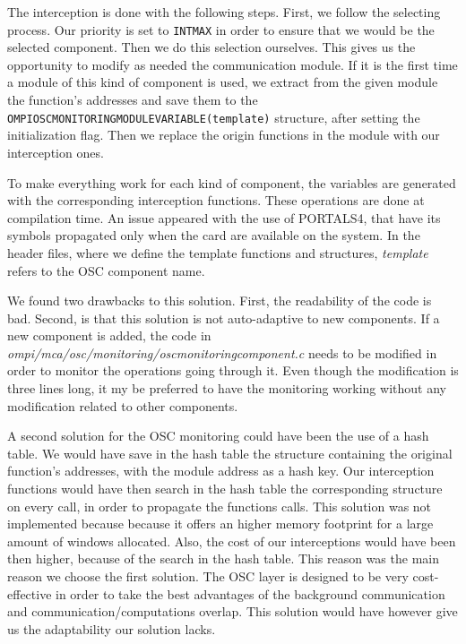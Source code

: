 The interception is done with the following steps. First, we follow
the selecting process. Our priority is set to {\tt INT\brkunds{}MAX}
in order to ensure that we would be the selected component. Then we do
this selection ourselves. This gives us the opportunity to modify as
needed the communication module. If it is the first time a module of
this kind of component is used, we extract from the given module the
function's addresses and save them to the {\tt
  OMPI\brkunds{}OSC\brkunds{}MONITORING\brkunds{}MODULE\brkunds{}VARIABLE(template)}
structure, after setting the initialization flag. Then we replace the
origin functions in the module with our interception ones.

To make everything work for each kind of component, the variables are
generated with the corresponding interception functions. These
operations are done at compilation time. An issue appeared with the
use of PORTALS4, that have its symbols propagated only when the card
are available on the system. In the header files, where we define the
template functions and structures, {\it template} refers to the OSC
component name.

We found two drawbacks to this solution. First, the readability of the
code is bad. Second, is that this solution is not auto-adaptive to new
components. If a new component is added, the code in {\it
  ompi/mca/osc/monitoring/osc\brkunds{}monitoring\brkunds{}component.c}
needs to be modified in order to monitor the operations going through
it. Even though the modification is three lines long, it my be
preferred to have the monitoring working without any modification
related to other components.

A second solution for the OSC monitoring could have been the use of a
hash table. We would have save in the hash table the structure
containing the original function's addresses, with the module address
as a hash key. Our interception functions would have then search in
the hash table the corresponding structure on every call, in order to
propagate the functions calls. This solution was not implemented
because because it offers an higher memory footprint for a large
amount of windows allocated. Also, the cost of our interceptions would
have been then higher, because of the search in the hash table. This
reason was the main reason we choose the first solution. The OSC layer
is designed to be very cost-effective in order to take the best
advantages of the background communication and
communication/computations overlap. This solution would have however
give us the adaptability our solution lacks.

